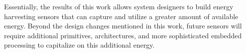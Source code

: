 Essentially, the results of this work allows system designers to build energy harvesting sensors that can capture and utilize a greater amount of available energy.
Beyond the design changes mentioned in this work, future sensors will require additional primitives, architectures, and more sophisticated embedded processing to capitalize on this additional energy.

%
%
%
%
%
%
%
